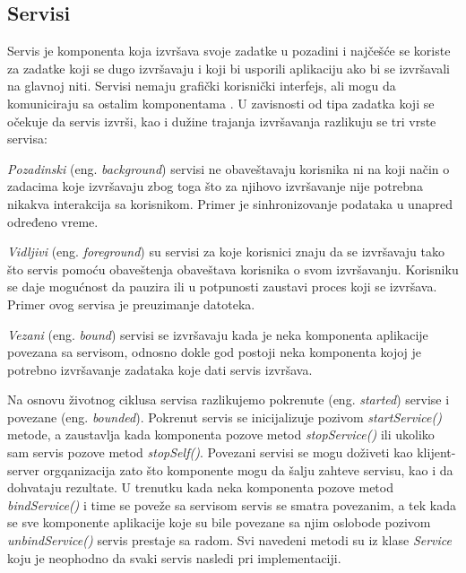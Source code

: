 \documentclass[android.tex]{subfiles}
\begin{document}
\subsection{Servisi}
Servis je komponenta koja izvršava svoje zadatke u pozadini i najčešće se koriste za zadatke koji se dugo izvršavaju i koji bi usporili aplikaciju ako bi se izvršavali na glavnoj niti. Servisi nemaju grafički korisnički interfejs, ali mogu da komuniciraju sa ostalim komponentama \cite{book:hellman}. U zavisnosti od tipa zadatka koji se očekuje da servis izvrši, kao i dužine trajanja izvršavanja razlikuju se tri vrste servisa:
\begin{description}
    \item \textit{Pozadinski} (eng. \textit{background}) servisi ne obaveštavaju korisnika ni na koji način o zadacima koje izvršavaju zbog toga što za njihovo izvršavanje nije potrebna nikakva interakcija sa korisnikom. Primer je sinhronizovanje podataka u unapred određeno vreme.  
    \item \textit{Vidljivi} (eng. \textit{foreground}) su servisi za koje korisnici znaju da se izvršavaju tako što servis pomoću obaveštenja obaveštava korisnika o svom izvršavanju. Korisniku se daje mogućnost da pauzira ili u potpunosti zaustavi proces koji se izvršava. Primer ovog servisa je preuzimanje datoteka.
    \item \textit{Vezani} (eng. \textit{bound}) servisi se izvršavaju kada je neka komponenta aplikacije povezana sa servisom, odnosno dokle god postoji neka komponenta kojoj je potrebno izvršavanje zadataka koje dati servis izvršava.
\end{description}

Na osnovu životnog ciklusa servisa razlikujemo pokrenute (eng. \textit{started}) servise i povezane (eng. \textit{bounded}). Pokrenut servis se inicijalizuje pozivom \textit{startService()} metode, a zaustavlja kada komponenta pozove metod \textit{stopService() }ili ukoliko sam servis pozove metod \textit{stopSelf()}. Povezani servisi se mogu doživeti kao klijent-server orgqanizacija zato što komponente mogu da šalju zahteve servisu, kao i da dohvataju rezultate. U trenutku kada neka komponenta pozove metod \textit{bindService()} i time se poveže sa servisom servis se smatra povezanim, a tek kada se sve komponente aplikacije koje su bile povezane sa njim oslobode pozivom \textit{unbindService()} servis prestaje sa radom. Svi navedeni metodi su iz klase \textit{Service} koju je neophodno da svaki servis nasledi pri implementaciji.
\end{document}
